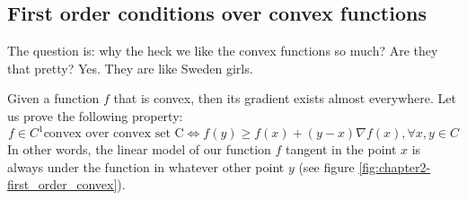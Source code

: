 \subsection{First order conditions over convex functions}
\par The question is: why the heck we like the convex functions so much? Are they that pretty? Yes. They are like Sweden girls.
\par Given a function $f$ that is convex, then its gradient exists almost everywhere. Let us prove the following property:
\begin{equation}
    f \in C^1 \mbox{convex over convex set C} \iff f(y) \geq f(x) + (y-x)\nabla f(x), \forall x,y \in C
    \label{eq:chapter2-first_order_convex}
\end{equation}
In other words, the linear model of our function $f$ tangent in the point $x$ is always under the function in whatever other point $y$ (see figure \ref{fig:chapter2-first_order_convex}).
